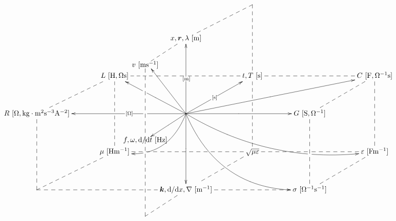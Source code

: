 \documentclass[a4,10pt]{article}
\makeatletter
\def\uni#1{[\!\unit{#1}]}
\def\cell#1#2{#1\,\uni{#2}}
\def\dotted#1{\ar@{--}[#1]}
\makeatother
\begin{document}
\def\cell#1#2{#1\,\unit{[#2]}}
\def\uni#1{}
\vspace{-10mm}
\def\tom{\ar@{->}[uu]|-{\unit{[m]}}}
\def\tos{\ar@{->}[ur]|-{\unit{[s]}}}
\def\toO{\ar@{->}[ll]|!{[]+(-20,-13);[]+(-20,13)}\hole|-{\unit{[O]}}}
\def\tomm{\ar[dd]|-{\uni{m^{-1}}}}
\def\toms{\ar@{->}+(-20,-13)*{\cell{f,\omega, \dd/\dd t}{Hz}}|-{\uni{s^{-1}}}}
\def\tomO{\ar[rr]|-{\uni{O^{-1}}}}
\def\arrr{\dotted{rr}}
\def\ardd{\dotted{dd}}
\def\arddsplit{\dotted{dd}|!{[ld];[rr]}\hole|!{[ld];[rd]}\hole}
\def\aruu{\dotted{uu}}
\def\arll{\dotted{ll}}
\def\arllsplit{\dotted{ll}|!{[ld];[lu]}\hole}
\def\arllsplitp{\dotted{ll}|!{[]+(-20,-13);[]+(-20,13)}\hole}
\def\arrrsplit{\dotted{rr}|!{[rd];[ru]+(-20,-13)}\hole|!{[rd];[ru]}\hole}
\def\ard{\dotted{d}}
\def\arur{\dotted{ur}}
\def\ardr{\dotted{dr}}
\def\ardl{\dotted{dl} |!{+(-8,-30);+(-8,30)}\hole}
\def\arrowzp{\ar@/^2pc/[dl]|-(0.4){\uni{Hm^{-1}}}|!{[]+(-20,-13);[]+(-20,13)}\hole}
\def\arrowzzp{\ar@/_2pc/[rrrd]|-(0.25){\uni{Fm^{-1}}}|!{[rr];[rrdd]}\hole }
\def\tolv{\ar@{--}'+(-20,-13)*{\cell{v}{m s^{-1}}}'[dd]+(-20,-13)}
\def\tov{\ar@{->}[uu]+(-20,-13)+(3,-2)}
\def\toL{\ar@{->}[ul]|-{\uni{H,Os}}|!{+(-12,-12);+(-12,12)}\hole}
\def\toC{\ar@{->}[urrr]|-{\uni{F,O^{-1}s}}}
\def\arrowyyp{\ar@/_3pc/@{->}[rrdd]|-(0.7){\uni{O^{-1}m^{-1}}}}
\def\tof{\ar@{--}'+(-20,-13)'[uu]+(-20,-13) |!{+(-10,-8);+(10,-8)}\hole}
\def\toT{\ar@{--}'[ur]'[dr]}
\[\xymatrix@=0.50in{
  &&*=0{}& *=0{} &\\
      &      & \cell{x,\bm r, \lambda}{m} \tolv \toT &      &      &      & \\
      &      \cell{L}{H,Os} \arrrsplit\arddsplit      &      & \cell{t,T}{s}\arrr\arddsplit      &      & \cell{C}{F,O^{-1}s} \ardd      &      \\
 \cell{R}{O,kg\cdot m^2 s^{-3} A^{-2}}\ardd\arur      &      & *=0{}\arrowyyp\toL\toC\tov\tom\tos\toO\tomO\tomm\toms \arrowzzp \arrowzp      &      & \cell{G}{S,\Omega^{-1}}\arur\ardd      &      & \\
      &      \cell{\mu}{Hm^{-1}}      &      & \sqrt{\mu\varepsilon}\ardl\arll      &      & \cell{\varepsilon}{Fm^{-1}} \arllsplit      &      \\
 *=0{} \arur      &      & \cell{\bm k,\dd/\dd x, \nabla}{m^{-1}} \arllsplitp\tof      &      & \cell{\sigma}{O^{-1}s^{-1}}\arll\arur      &      & \\
 }\]
\end{document}
